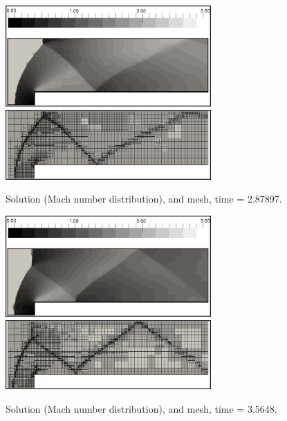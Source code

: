 \begin{figure}[H]
\begin{center}
\includegraphics[width=0.7\textwidth]{examples_img/forward-step/sln3.png}\\
\vspace{2mm}
\includegraphics[width=0.7\textwidth]{examples_img/forward-step/mesh3.png}
\end{center}

\caption{Solution (Mach number distribution), and mesh, time = 2.87897.}

\label{fig:ffs-3}
\end{figure}

\begin{figure}[H]
\begin{center}
\includegraphics[width=0.7\textwidth]{examples_img/forward-step/sln4.png}\\
\vspace{2mm}
\includegraphics[width=0.7\textwidth]{examples_img/forward-step/mesh4.png}
\end{center}

\caption{Solution (Mach number distribution), and mesh, time = 3.5648.}

\label{fig:ffs-4}
\end{figure}
